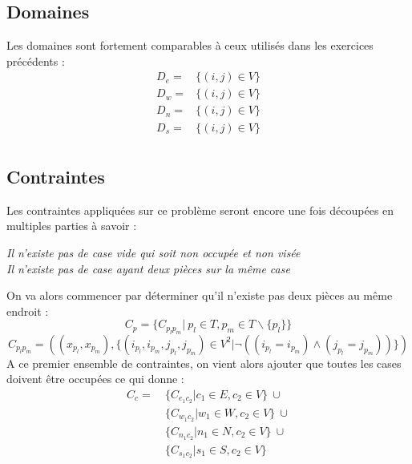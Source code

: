 \documentclass[a4paper]{article}
\begin{document}
\subsection{Domaines}
Les domaines sont fortement comparables à ceux utilisés dans les exercices précédents : 
\begin{align*}
D_e =& \{ (i,j) \in V \} \\ 
D_w =& \{ (i,j) \in V \} \\ 
D_n =& \{ (i,j) \in V \} \\ 
D_s =& \{ (i,j) \in V \} \\ 
\end{align*}
\subsection{Contraintes}
Les contraintes appliquées sur ce problème seront encore une fois découpées en multiples parties à savoir : 
\begin{center}
\textit{Il n'existe pas de case vide qui soit non occupée et non visée} \vspace{0.1cm} \\
\textit{Il n'existe pas de case ayant deux pièces sur la même case}
\end{center}
On va alors commencer par déterminer qu'il n'existe pas deux pièces au même endroit : 
\begin{equation*}
C_p = \{ C_{p_lp_m} | \ p_l \in T, p_m \in T \backslash \{ p_l \} \}
\end{equation*}
\begin{equation*}
C_{p_lp_m} = ((x_{p_l},x_{p_m}), \{ (i_{p_l},i_{p_m},j_{p_l},j_{p_m}) \in V^2 | \neg((i_{p_l} = i_{p_m}) \wedge (j_{p_l} = j_{p_m}))  \}  )
\end{equation*}
A ce premier ensemble de contraintes, on vient alors ajouter que toutes les cases doivent être occupées ce qui donne : 
\begin{align*}
C_c = \ & \{ C_{e_1c_2} | c_1 \in E, c_2 \in  V \} \ \cup \\
 & \{ C_{w_1c_2} | w_1 \in W, c_2 \in V \} \ \cup \\
 & \{ C_{n_1c_2} | n_1 \in N, c_2 \in V \} \ \cup \\
 & \{ C_{s_1c_2} | s_1 \in S, c_2 \in V \} 
\end{align*}
\end{document}
